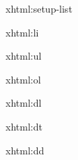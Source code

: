 %
%
%

\startxmlsetups xhtml:setup-list
\stopxmlsetups


\startxmlsetups xhtml:li
	\item
\stopxmlsetups

\startxmlsetups xhtml:ul
	\startitemize
	\stopitemize
\stopxmlsetups

\startxmlsetups xhtml:ol
	\startitemize[n]
	\stopitemize
\stopxmlsetups


\startxmlsetups xhtml:dl
	\par
\stopxmlsetups

\startxmlsetups xhtml:dt
	\crlf
\stopxmlsetups

\startxmlsetups xhtml:dd
	\startnarrower
	\stopnarrower
\stopxmlsetups

